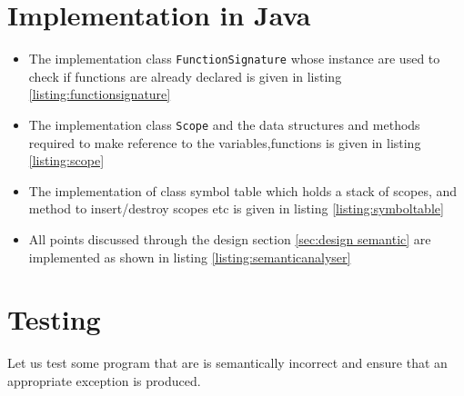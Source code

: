 \section{Implementation in Java}
\begin{itemize}
    \item The implementation class \verb!FunctionSignature! whose instance are used to check if functions are already declared is given in listing \ref{listing:functionsignature}
    \item The implementation class \verb!Scope! and the data structures and methods required to make reference to the variables,functions is given in listing \ref{listing:scope}
    \item The implementation of class symbol table which holds a stack of scopes, and method to insert/destroy scopes etc is given in listing \ref{listing:symboltable}
    \item All points discussed through the design section \ref{sec:design semantic} are implemented as shown in listing \ref{listing:semanticanalyser}
    \end{itemize}
    
    
    
\section{Testing}

Let us test some program that are is semantically incorrect and ensure that an appropriate exception is produced.


